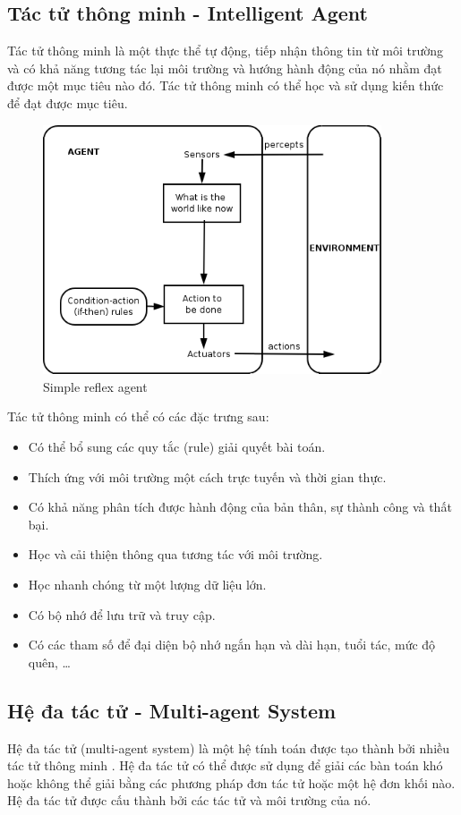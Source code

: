 \documentclass[../report.tex]{subfiles}
\begin{document}
\subsection{Tác tử thông minh - Intelligent Agent}
Tác tử thông minh là một thực thể tự động, tiếp nhận thông tin từ môi trường và có khả năng tương tác lại môi trường 
và hướng hành động của nó nhằm đạt được một mục tiêu nào đó.
Tác tử thông minh có thể học và sử dụng kiến thức để đạt được mục tiêu. \cite{intelligent-agent-wiki}

\begin{figure}[H]
\centering
\includegraphics[width=10cm]{figures/simple-reflex-agent.png}
\caption{Simple reflex agent}
\end{figure}

Tác tử thông minh có thể có các đặc trưng sau: 
\begin{itemize}
    \item Có thể bổ sung các quy tắc (rule) giải quyết bài toán. 
    \item Thích ứng với môi trường một cách trực tuyến và thời gian thực. 
    \item Có khả năng phân tích được hành động của bản thân, sự thành công và thất bại. 
    \item Học và cải thiện thông qua tương tác với môi trường. 
    \item Học nhanh chóng từ một lượng dữ liệu lớn. 
    \item Có bộ nhớ để lưu trữ và truy cập. 
    \item Có các tham số để đại diện bộ nhớ ngắn hạn và dài hạn, tuổi tác, mức độ quên, \ldots 
\end{itemize}


\subsection{Hệ đa tác tử - Multi-agent System}
Hệ đa tác tử (multi-agent system) là một hệ tính toán được tạo thành bởi nhiều tác tử thông minh \cite{multi-agent-system-wiki}.
Hệ đa tác tử có thể được sử dụng để giải các bàn toán khó hoặc không thể giải bằng các phương pháp đơn tác tử hoặc một hệ đơn khối nào. 
Hệ đa tác tử được cấu thành bởi các tác tử và môi trường của nó. 
\end{document}
